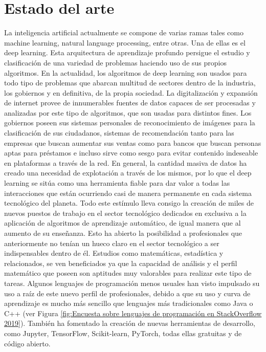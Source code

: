 \section{Estado del arte}\label{sec:estado-del-arte}
La inteligencia artificial actualmente se compone de varias ramas tales como machine learning, natural language processing, entre otras.
Una de ellas es el deep learning.
Esta arquitectura de aprendizaje profundo persigue el estudio y clasificación de una variedad de problemas
haciendo uso de sus propios algoritmos.
En la actualidad, los algoritmos de deep learning son usados para todo tipo de problemas que abarcan multitud de sectores dentro de la industria, los gobiernos y en definitiva, de la propia sociedad.
La digitalización y expansión de internet provee de innumerables fuentes de datos capaces de ser procesadas y analizadas por este tipo de algoritmos, que son usadas para distintos fines.
Los gobiernos poseen sus sistemas personales de reconocimiento de imágenes para la clasificación de sus ciudadanos, sistemas de recomendación tanto para las empresas que buscan aumentar sus ventas como para bancos que buscan personas aptas para préstamos e incluso sirve como sesgo para evitar contenido indeseable en plataformas a través de la red.
En general, la cantidad masiva de datos ha creado una necesidad de explotación a
través de los mismos, por lo que el deep learning se sitúa como una herramienta fiable para dar valor a todas las interacciones que están ocurriendo casi de manera permanente
en cada sistema tecnológico del planeta.
Todo este estímulo lleva consigo la creación de miles de nuevos puestos de trabajo en el sector tecnológico dedicados en exclusiva a la aplicación de algoritmos de aprendizaje automático, de igual manera que al aumento de su enseñanza.
Esto ha abierto la posibilidad a profesionales que anteriormente no tenían un hueco claro en el sector tecnológico a ser indispensables dentro de él.
Estudios como matemáticas, estadística y relacionados,
se ven beneficiados ya que la capacidad de análisis y el perfil matemático que poseen son aptitudes muy valorables para realizar este tipo de tareas.
Algunos lenguajes de programación menos usuales han visto impulsado su uso a raíz de este nuevo perfil de profesionales, debido a que su uso y curva de aprendizaje es mucho más sencillo que lenguajes más tradicionales como Java o C++ (ver Figura \ref{fig:Encuesta sobre lenguajes de programación en StackOverflow 2019}).
También ha fomentado la creación de nuevas herramientas de desarrollo, como Jupyter, TensorFlow, Scikit-learn, PyTorch, todas ellas gratuitas y de código abierto.

